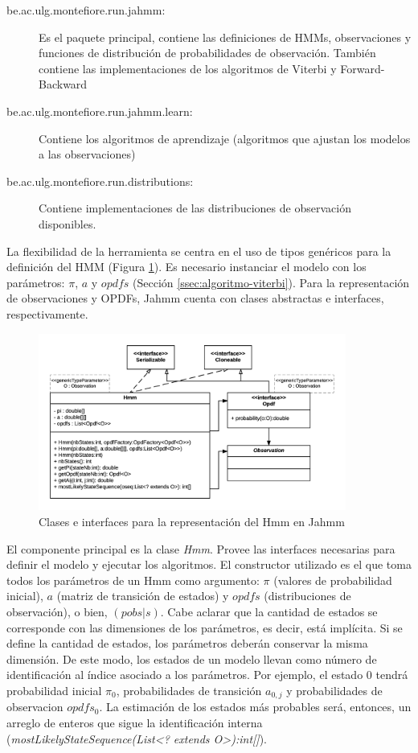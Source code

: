 \begin{description}
\item [be.ac.ulg.montefiore.run.jahmm:] Es el paquete principal, contiene las definiciones de HMMs, observaciones y funciones de distribución de probabilidades de observación. También contiene las implementaciones de los algoritmos de Viterbi y Forward-Backward
\item [be.ac.ulg.montefiore.run.jahmm.learn:] Contiene los algoritmos de aprendizaje (algoritmos que ajustan los modelos a las observaciones)
\item [be.ac.ulg.montefiore.run.distributions:] Contiene implementaciones de las distribuciones de observación disponibles.
\end{description}

 La flexibilidad de la herramienta se centra en el uso de tipos genéricos para la definición del HMM (Figura \ref{fig:jahmm-modulos}). Es necesario instanciar el modelo con los parámetros: $\pi$, $a$ y $opdfs$ (Sección \ref{ssec:algoritmo-viterbi}). Para la representación de observaciones y OPDFs, Jahmm cuenta con clases abstractas e interfaces, respectivamente. 

\begin{figure}[!htp]
	\centering
	\includegraphics[width=0.9\textwidth]{images/jahmm-modulos.png}
	\captionsetup{width=0.8\textwidth}
	\caption{Clases e interfaces para la representación del Hmm en Jahmm}
    \label{fig:jahmm-modulos}
\end{figure}

El componente principal es la clase \textit{Hmm}. Provee las interfaces necesarias para definir el modelo y ejecutar los algoritmos. El constructor utilizado es el que toma todos los parámetros de un Hmm como argumento: $\pi$ (valores de probabilidad inicial), $a$ (matriz de transición de estados) y $opdfs$ (distribuciones de observación), o bien, $(pobs|s)$. Cabe aclarar que la cantidad de estados se corresponde con las dimensiones de los parámetros, es decir, está implícita. Si se define la cantidad de estados, los parámetros deberán conservar la misma dimensión. De este modo, los estados de un modelo llevan como número de identificación al índice asociado a los parámetros. Por ejemplo, el estado 0 tendrá probabilidad inicial $\pi_0$, probabilidades de transición $a_{0,j}$ y probabilidades de observacion $opdfs_{0}$. La estimación de los estados más probables será, entonces, un arreglo de enteros que sigue la identificación interna (\textit{mostLikelyStateSequence(List<? extends O>):int[]}).

